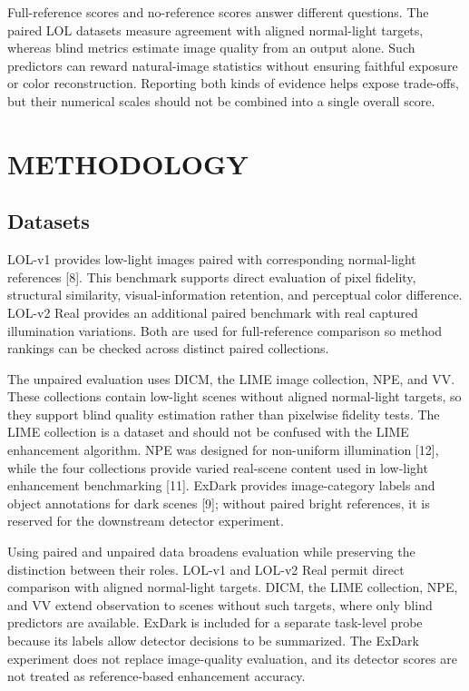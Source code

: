 \documentclass[conference]{IEEEtran}
\begin{document}
Full-reference scores and no-reference scores answer different questions. The paired LOL datasets measure agreement with aligned normal-light targets, whereas blind metrics estimate image quality from an output alone. Such predictors can reward natural-image statistics without ensuring faithful exposure or color reconstruction. Reporting both kinds of evidence helps expose trade-offs, but their numerical scales should not be combined into a single overall score.

\section{METHODOLOGY}

\subsection{Datasets}

LOL-v1 provides low-light images paired with corresponding normal-light references [8]. This benchmark supports direct evaluation of pixel fidelity, structural similarity, visual-information retention, and perceptual color difference. LOL-v2 Real provides an additional paired benchmark with real captured illumination variations. Both are used for full-reference comparison so method rankings can be checked across distinct paired collections.

The unpaired evaluation uses DICM, the LIME image collection, NPE, and VV. These collections contain low-light scenes without aligned normal-light targets, so they support blind quality estimation rather than pixelwise fidelity tests. The LIME collection is a dataset and should not be confused with the LIME enhancement algorithm. NPE was designed for non-uniform illumination [12], while the four collections provide varied real-scene content used in low-light enhancement benchmarking [11]. ExDark provides image-category labels and object annotations for dark scenes [9]; without paired bright references, it is reserved for the downstream detector experiment.

Using paired and unpaired data broadens evaluation while preserving the distinction between their roles. LOL-v1 and LOL-v2 Real permit direct comparison with aligned normal-light targets. DICM, the LIME collection, NPE, and VV extend observation to scenes without such targets, where only blind predictors are available. ExDark is included for a separate task-level probe because its labels allow detector decisions to be summarized. The ExDark experiment does not replace image-quality evaluation, and its detector scores are not treated as reference-based enhancement accuracy.
\end{document}

